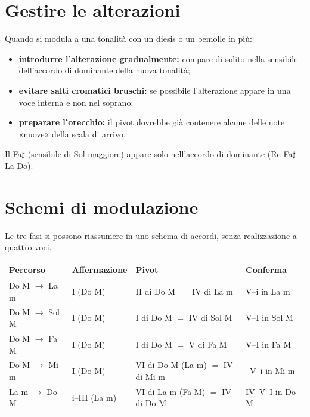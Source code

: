 \section{Gestire le alterazioni}
\label{subsec:gestione_alterazioni}

\begin{regola}
	\label{reg:introduzione_alterazioni}
	Quando si modula a una tonalità con un diesis o un bemolle in più:
	\begin{itemize}
		\item \textbf{introdurre l'alterazione gradualmente:} compare di solito nella sensibile dell'accordo di dominante della nuova tonalità;
		\item \textbf{evitare salti cromatici bruschi:} se possibile l'alterazione appare in una voce interna e non nel soprano;
		\item \textbf{preparare l'orecchio:} il pivot dovrebbe già contenere alcune delle note «nuove» della scala di arrivo.
	\end{itemize}
\end{regola}

\begin{esempio}
	\label{ex:gestione_fad}
	Il Fa$\sharp$ (sensibile di Sol maggiore) appare solo nell'accordo di dominante (Re-Fa$\sharp$-La-Do).
\end{esempio}

\section{Schemi di modulazione}
\label{sec:esempi_completi}

Le tre fasi si possono riassumere in uno schema di accordi, senza realizzazione a quattro voci.

\begin{center}
\small
\begin{tabularx}{\linewidth}{lLLL}
\toprule
\textbf{Percorso} & \textbf{Affermazione} & \textbf{Pivot} & \textbf{Conferma} \\
\midrule
Do M $\rightarrow$ La m & I (Do M) & II di Do M $=$ IV di La m & V--i in La m \\
Do M $\rightarrow$ Sol M & I (Do M) & I di Do M $=$ IV di Sol M & V--I in Sol M \\
Do M $\rightarrow$ Fa M & I (Do M) & I di Do M $=$ V di Fa M & V--I in Fa M \\
Do M $\rightarrow$ Mi m & I (Do M) & VI di Do M (La m) $=$ IV di Mi m & --V--i in Mi m \\
La m $\rightarrow$ Do M & i--III (La m) & VI di La m (Fa M) $=$ IV di Do M & IV--V--I in Do M \\
\bottomrule
\end{tabularx}
\end{center}

